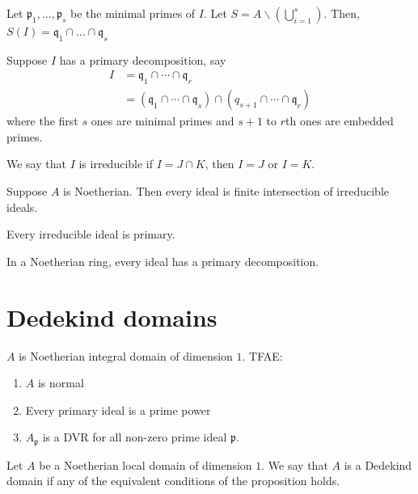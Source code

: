 \documentclass[oneside, 12pt]{scrbook}
\newcommand{\pr}{\mathfrak{p}}
\newcommand{\bs}{\backslash}
\theoremstyle{theorem}
\begin{document}
\begin{proposition}
Let $\pr_{1}, \hdots , \pr_{s}$ be the minimal primes of $I$. Let $S = A \bs \left( \bigcup_{i=1}^s  \right)$. Then, $S(I) = \mathfrak{q}_{1} \cap \hdots \cap \mathfrak{q}_{s}$
\end{proposition}

Suppose $I$ has a primary decomposition, say 
\begin{align*}
I &= \mathfrak{q}_{1} \cap \cdots \cap \mathfrak{q}_{r} \\
&= (\mathfrak{q}_{1} \cap \cdots \cap \mathfrak{q}_{s}) \cap (q_{s+1} \cap \cdots \cap \mathfrak{q}_{r})
\end{align*}
where the first $s$ ones are minimal primes and $s+1$ to $r$th ones are embedded primes.

\begin{definition}
We say that $I$ is irreducible if $I = J \cap K$, then $I = J$ or $I =K$.
\end{definition}

\begin{theorem}
Suppose $A$ is Noetherian. Then every ideal is finite intersection of irreducible ideals.
\end{theorem}

\begin{proposition}
Every irreducible ideal is primary.
\end{proposition}

\begin{corollary}
In a Noetherian ring, every ideal has a primary decomposition.
\end{corollary}

\chapter{Dedekind domains}

\begin{proposition}
$A$ is Noetherian integral domain of dimension $1$. TFAE: 
\begin{enumerate}
\item $A$ is normal
\item Every primary ideal is a prime power
\item $A_{\pr}$ is a DVR for all non-zero prime ideal $\pr$.
\end{enumerate}
\end{proposition}

\begin{definition}
Let $A$ be a Noetherian local domain of dimension $1$. We say that $A$ is a Dedekind domain if any of the equivalent conditions of the proposition holds.
\end{definition}
\end{document}
